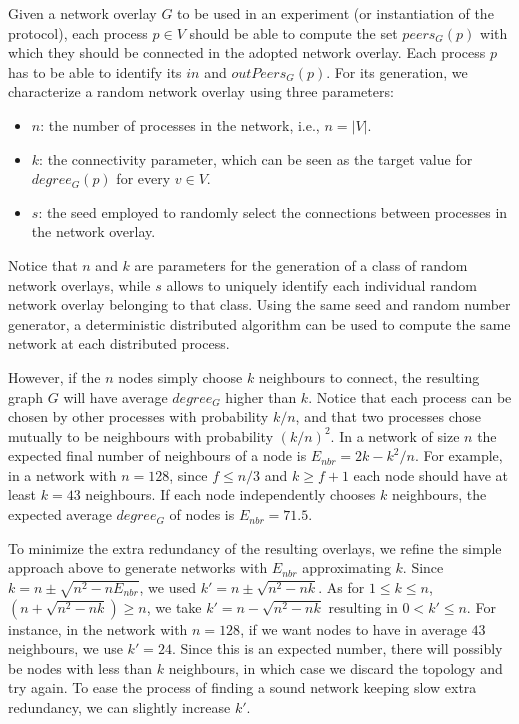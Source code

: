 Given a network overlay $G$ to be used in an experiment (or instantiation of
the protocol), each process $p \in V$ should be able to compute the 
set $peers_G(p)$ with which they should be connected in the adopted network overlay.
Each process $p$ has to be able to identify its $in$ and $outPeers_G(p)$.
%
For its generation, we characterize a random network overlay using three parameters:
\begin{itemize}
	\item  $n$: the number of processes in the network, i.e., $n = |V|$.
    \item  $k$: the connectivity parameter, which can be seen as the target value for
  $degree_G(p)$ for every $v \in V$.
    \item $s$: the seed employed to randomly select the connections between processes
  in the network overlay.
\end{itemize}

Notice that $n$ and $k$ are parameters for the generation of a class of random
network overlays, while $s$ allows to uniquely identify each individual random
network overlay belonging to that class.   
%
Using the same seed and random number generator, a deterministic distributed algorithm can be used to compute the same network at each distributed process. 

However, if the $n$ nodes simply choose $k$ neighbours to connect, the resulting graph $G$ will have average $degree_G$ higher than $k$.
%
Notice that each process can be chosen by 
other processes with probability $k/n$, and that two processes chose mutually to be neighbours with probability $(k/n)^2$.
In a network of size $n$ the expected final number of neighbours of a node is $E_{nbr} = 2 k - k^2/n$.  
%
For example, in a network with $n=128$, since $f \leq n/3$ and $k\geq f+1$ each node should have at least $k=43$ neighbours. If each node independently chooses $k$ neighbours, the expected average $degree_G$ of nodes is $E_{nbr}=71.5$.

To minimize the extra redundancy of the resulting overlays,
we refine the simple approach above to generate networks with $E_{nbr}$ approximating $k$.  Since $k = n \pm \sqrt{n^2-n E_{nbr}}$, we used $k' = n \pm \sqrt{n^2-n k}$.  As for $1 \leq k \leq n$, $(n + \sqrt{n^2-n k}) \geq n$, we take $k' = n - \sqrt{n^2-n k}$ resulting in $0< k'\leq n$.    
For instance, in the network with $n=128$, if we want nodes to have in average $43$ neighbours, we use $k'=24$.  Since this is an expected number, there will possibly be nodes with less than $k$ neighbours, in which case we discard the topology and try again.   To ease the process of finding a sound network keeping slow extra redundancy, 
we can slightly increase $k'$.

